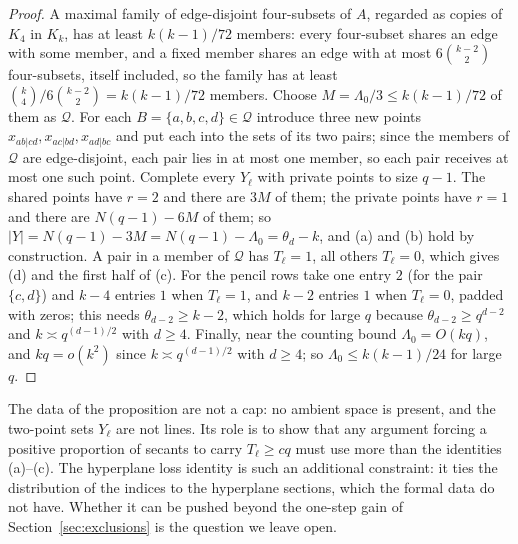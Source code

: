 \begin{proof}
A maximal family of edge-disjoint four-subsets of \(A\), regarded as
copies of \(K_4\) in \(K_k\), has at least \(k(k-1)/72\) members: every
four-subset shares an edge with some member, and a fixed member shares an
edge with at most \(6\binom{k-2}{2}\) four-subsets, itself included, so
the family has at least \(\binom{k}{4}/6\binom{k-2}{2}=k(k-1)/72\)
members.  Choose \(M=\Lambda_0/3\le k(k-1)/72\) of them as \(\mathcal Q\).
For each \(B=\{a,b,c,d\}\in\mathcal Q\) introduce three new points
\(x_{ab|cd},x_{ac|bd},x_{ad|bc}\) and put each into the sets of its two
pairs; since the members of \(\mathcal Q\) are edge-disjoint, each pair
lies in at most one member, so each pair receives at most one such point.
Complete every \(Y_\ell\) with private points to size \(q-1\).  The
shared points have \(r=2\) and there are \(3M\) of them; the private
points have \(r=1\) and there are \(N(q-1)-6M\) of them; so
\(|Y|=N(q-1)-3M=N(q-1)-\Lambda_0=\theta_d-k\), and (a) and (b) hold by
construction.  A pair in a member of \(\mathcal Q\) has \(T_\ell=1\), all
others \(T_\ell=0\), which gives (d) and the first half of (c).  For the
pencil rows take one entry \(2\) (for the pair \(\{c,d\}\)) and \(k-4\)
entries \(1\) when \(T_\ell=1\), and \(k-2\) entries \(1\) when
\(T_\ell=0\), padded with zeros; this needs \(\theta_{d-2}\ge k-2\), which
holds for large \(q\) because \(\theta_{d-2}\ge q^{d-2}\) and
\(k\asymp q^{(d-1)/2}\) with \(d\ge4\).  Finally, near the counting bound
\(\Lambda_0=O(kq)\), and \(kq=o(k^2)\) since \(k\asymp q^{(d-1)/2}\) with
\(d\ge4\); so \(\Lambda_0\le k(k-1)/24\) for large \(q\).
\end{proof}

The data of the proposition are not a cap: no ambient space is present,
and the two-point sets \(Y_\ell\) are not lines.  Its role is to show
that any argument forcing a positive proportion of secants to carry
\(T_\ell\ge cq\) must use more than the identities (a)--(c).  The
hyperplane loss identity is such an additional constraint: it ties the
distribution of the indices to the hyperplane sections, which the formal
data do not have.  Whether it can be pushed beyond the one-step gain of
Section~\ref{sec:exclusions} is the question we leave open.
